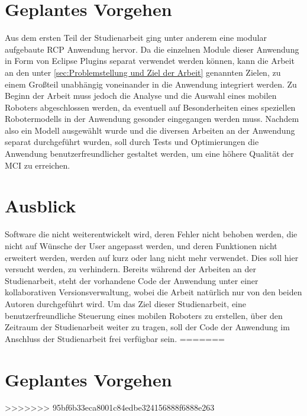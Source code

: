 \section{Geplantes Vorgehen}
Aus dem ersten Teil der Studienarbeit ging unter anderem eine modular aufgebaute \gls{RCP} Anwendung hervor. Da die einzelnen Module dieser Anwendung in Form von Eclipse Plugins separat verwendet werden k\"onnen, kann die Arbeit an den unter \ref{sec:Problemstellung und Ziel der Arbeit} genannten Zielen, zu einem Gro\ss teil unabh\"angig voneinander in die Anwendung integriert werden.
\newline
Zu Beginn der Arbeit muss jedoch die Analyse und die Auswahl eines mobilen Roboters abgeschlossen werden, da eventuell auf Besonderheiten eines speziellen Robotermodells in der Anwendung gesonder eingegangen werden muss.
\newline
Nachdem also ein Modell ausgew\"ahlt wurde und die diversen Arbeiten an der Anwendung separat durchgef\"uhrt wurden, soll durch Tests und Optimierungen die Anwendung benutzerfreundlicher gestaltet werden, um eine h\"ohere Qualit\"at der \gls{MCI} zu erreichen.

\section{Ausblick}
Software die nicht weiterentwickelt wird, deren Fehler nicht behoben werden, die nicht auf W\"unsche der User angepasst werden, und deren Funktionen nicht erweitert werden, werden auf kurz oder lang nicht mehr verwendet. Dies soll hier versucht werden, zu verhindern. Bereits w\"ahrend der Arbeiten an der Studienarbeit, steht der vorhandene Code der Anwendung unter einer kollaborativen Versionsverwaltung, wobei die Arbeit nat\"urlich nur von den beiden Autoren durchgef\"uhrt wird. Um das Ziel dieser Studienarbeit, eine benutzerfreundliche Steuerung eines mobilen Roboters zu erstellen, \"uber den Zeitraum der Studienarbeit weiter zu tragen, soll der Code der Anwendung im Anschluss der Studienarbeit frei verf\"ugbar sein.
=======

\section{Geplantes Vorgehen}
>>>>>>> 95bf6b33eca8001c84edbe324156888f6888e263
